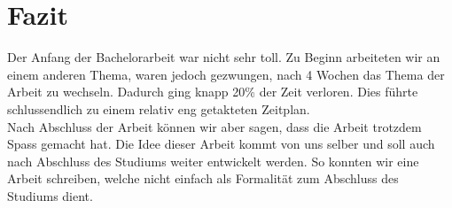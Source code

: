 \section{Fazit}
Der Anfang der Bachelorarbeit war nicht sehr toll. Zu Beginn arbeiteten wir an einem anderen Thema, waren jedoch gezwungen, nach 4 Wochen das Thema der Arbeit zu wechseln. Dadurch ging knapp  20\% der Zeit verloren. Dies führte schlussendlich zu einem relativ eng getakteten Zeitplan. \\

Nach Abschluss der Arbeit können wir aber sagen, dass die Arbeit trotzdem Spass gemacht hat. Die Idee dieser Arbeit kommt von uns selber und soll auch nach Abschluss des Studiums weiter entwickelt werden. So konnten wir eine Arbeit schreiben, welche nicht einfach als Formalität zum Abschluss des Studiums dient.
